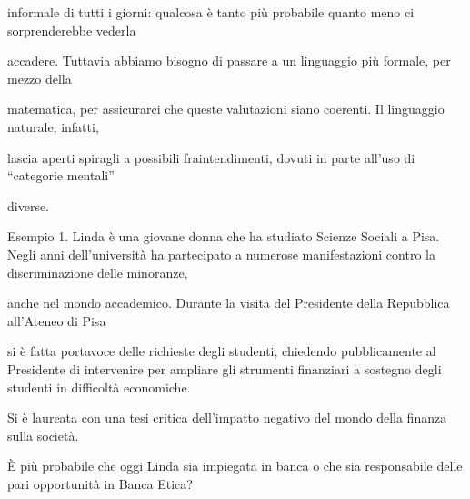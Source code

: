 \documentclass[a4paper,portrait,12pt]{article}
\begin{document}
\begin{flushleft}
informale di tutti i giorni: qualcosa \`{e} tanto più probabile quanto meno ci sorprenderebbe vederla
\end{flushleft}


\begin{flushleft}
accadere. Tuttavia abbiamo bisogno di passare a un linguaggio più formale, per mezzo della
\end{flushleft}


\begin{flushleft}
matematica, per assicurarci che queste valutazioni siano coerenti. Il linguaggio naturale, infatti,
\end{flushleft}


\begin{flushleft}
lascia aperti spiragli a possibili fraintendimenti, dovuti in parte all'uso di {``}categorie mentali''
\end{flushleft}


\begin{flushleft}
diverse.
\end{flushleft}


\begin{flushleft}
Esempio 1. Linda \`{e} una giovane donna che ha studiato Scienze Sociali a Pisa. Negli anni dell'universit\`{a} ha partecipato a numerose manifestazioni contro la discriminazione delle minoranze,
\end{flushleft}


\begin{flushleft}
anche nel mondo accademico. Durante la visita del Presidente della Repubblica all'Ateneo di Pisa
\end{flushleft}


\begin{flushleft}
si \`{e} fatta portavoce delle richieste degli studenti, chiedendo pubblicamente al Presidente di intervenire per ampliare gli strumenti finanziari a sostegno degli studenti in difficolt\`{a} economiche.
\end{flushleft}


\begin{flushleft}
Si \`{e} laureata con una tesi critica dell'impatto negativo del mondo della finanza sulla societ\`{a}.
\end{flushleft}


\begin{flushleft}
\`{E} più probabile che oggi Linda sia impiegata in banca o che sia responsabile delle pari opportunit\`{a} in Banca Etica?
\end{flushleft}
\end{document}
